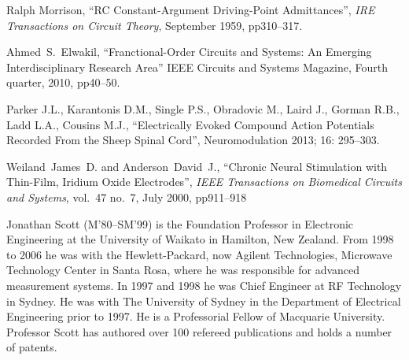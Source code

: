 \documentclass[journal, a4paper]{IEEEtran}
\begin{document}
\begin{thebibliography}{99}
Ralph Morrison,
``RC Constant-Argument Driving-Point Admittances'',
{\em IRE Transactions on Circuit Theory},
September 1959, pp310--317.

Ahmed~S.~Elwakil,
``Franctional-Order Circuits and Systems: An Emerging Interdisciplinary Research Area''
IEEE Circuits and Systems Magazine, Fourth quarter, 2010, pp40--50.

Parker J.L., Karantonis D.M., Single P.S., Obradovic M., Laird J., Gorman R.B., Ladd L.A., Cousins M.J.,
``Electrically Evoked Compound Action Potentials Recorded From the Sheep Spinal Cord'',
Neuromodulation 2013; 16: 295--303.


Weiland~James~D. and Anderson~David~J.,
``Chronic Neural Stimulation with Thin-Film, Iridium Oxide Electrodes'',
{\em IEEE Transactions on Biomedical Circuits and Systems},
vol.~47 no.~7, July 2000, pp911--918




\end{thebibliography}


\begin{IEEEbiography}{Jonathan Scott}
(M'80--SM'99) is the Foundation Professor in
Electronic Engineering at the University of Waikato in Hamilton, New
Zealand.  From 1998 to 2006 he was with the Hewlett-Packard,
now Agilent Technologies, Microwave Technology Center in Santa Rosa,
where he was responsible for advanced measurement systems.  In 1997 and
1998 he was Chief Engineer at RF Technology in Sydney.  He was with The
University of Sydney in the Department of Electrical Engineering prior
to 1997.  He is a Professorial Fellow of Macquarie
University.  Professor Scott has authored over 100 refereed
publications and holds a number of patents.
\end{IEEEbiography}
\end{document}
